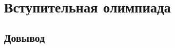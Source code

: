 
\section*{Вступительная олимпиада}


\begingroup
    \providecommand\ifsolutions{\iffalse}
    \long\def\solution#1{\ifsolutions\emph{Решение.} {#1}\fi}
    \def\abs#1{\lvert #1 \rvert}

\subsection*{Довывод}

